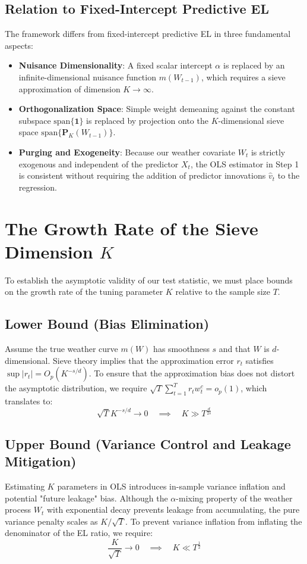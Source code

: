 \documentclass{article}
\begin{document}
\subsection{Relation to Fixed-Intercept Predictive EL}

The framework differs from fixed-intercept predictive EL in three fundamental aspects:
\begin{itemize}
    \item \textbf{Nuisance Dimensionality}: A fixed scalar intercept $\alpha$ is replaced by an infinite-dimensional nuisance function $m(W_{t-1})$, which requires a sieve approximation of dimension $K \to \infty$.
    \item \textbf{Orthogonalization Space}: Simple weight demeaning against the constant subspace $\text{span}\{\bm{1}\}$ is replaced by projection onto the $K$-dimensional sieve space $\text{span}\{\bm{P}_K(W_{t-1})\}$.
    \item \textbf{Purging and Exogeneity}: Because our weather covariate $W_t$ is strictly exogenous and independent of the predictor $X_t$, the OLS estimator in Step 1 is consistent without requiring the addition of predictor innovations $\widehat{v}_t$ to the regression.
\end{itemize}

\section{The Growth Rate of the Sieve Dimension $K$}

To establish the asymptotic validity of our test statistic, we must place bounds on the growth rate of the tuning parameter $K$ relative to the sample size $T$.

\subsection{Lower Bound (Bias Elimination)}
Assume the true weather curve $m(W)$ has smoothness $s$ and that $W$ is $d$-dimensional. Sieve theory implies that the approximation error $r_t$ satisfies $\sup |r_t| = O_p(K^{-s/d})$. To ensure that the approximation bias does not distort the asymptotic distribution, we require $\sqrt{T} \sum_{t=1}^T r_t w^c_t = o_p(1)$, which translates to:
\begin{equation}
    \sqrt{T} K^{-s/d} \to 0 \quad \implies \quad K \gg T^{\frac{d}{2s}}
\end{equation}

\subsection{Upper Bound (Variance Control and Leakage Mitigation)}
Estimating $K$ parameters in OLS introduces in-sample variance inflation and potential "future leakage" bias. Although the $\alpha$-mixing property of the weather process $W_t$ with exponential decay prevents leakage from accumulating, the pure variance penalty scales as $K / \sqrt{T}$. To prevent variance inflation from inflating the denominator of the EL ratio, we require:
\begin{equation}
    \frac{K}{\sqrt{T}} \to 0 \quad \implies \quad K \ll T^{\frac{1}{2}}
\end{equation}
\end{document}

